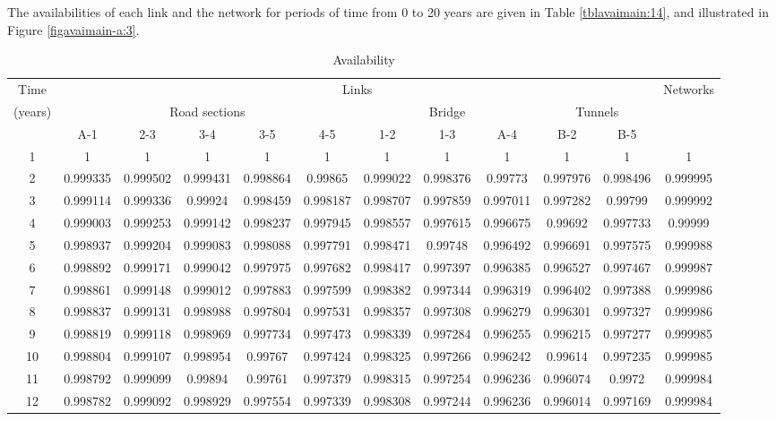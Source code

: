 The availabilities of each link and the network for periods of time from
0 to 20 years are given in Table \ref{tblavaimain:14}, and illustrated in Figure
\ref{figavaimain-a:3}.

\begin{table}[h]
\caption{Availability}
\begin{tabular}{|c|c|c|c|c|c|c|c|c|c|c|c|}
\hline
Time & \multicolumn{10}{c|}{Links} & Networks \\ 
\cline{2-11}
(years) & \multicolumn{5}{c|}{Road sections} & \multicolumn{3}{c|}{Bridge} & \multicolumn{2}{c|}{Tunnels} &  \\ 
\cline{2-11}
 & A-1 & 2-3 & 3-4 & 3-5 & 4-5 & 1-2 & 1-3 & A-4 & B-2 & B-5 &  \\ 
\hline
1 & 1 & 1 & 1 & 1 & 1 & 1 & 1 & 1 & 1 & 1 & 1 \\ 
\hline
2 & 0.999335 & 0.999502 & 0.999431 & 0.998864 & 0.99865 & 0.999022 & 0.998376 & 0.99773 & 0.997976 & 0.998496 & 0.999995 \\ 
\hline
3 & 0.999114 & 0.999336 & 0.99924 & 0.998459 & 0.998187 & 0.998707 & 0.997859 & 0.997011 & 0.997282 & 0.99799 & 0.999992 \\ 
\hline
4 & 0.999003 & 0.999253 & 0.999142 & 0.998237 & 0.997945 & 0.998557 & 0.997615 & 0.996675 & 0.99692 & 0.997733 & 0.99999 \\ 
\hline
5 & 0.998937 & 0.999204 & 0.999083 & 0.998088 & 0.997791 & 0.998471 & 0.99748 & 0.996492 & 0.996691 & 0.997575 & 0.999988 \\ 
\hline
6 & 0.998892 & 0.999171 & 0.999042 & 0.997975 & 0.997682 & 0.998417 & 0.997397 & 0.996385 & 0.996527 & 0.997467 & 0.999987 \\ 
\hline
7 & 0.998861 & 0.999148 & 0.999012 & 0.997883 & 0.997599 & 0.998382 & 0.997344 & 0.996319 & 0.996402 & 0.997388 & 0.999986 \\ 
\hline
8 & 0.998837 & 0.999131 & 0.998988 & 0.997804 & 0.997531 & 0.998357 & 0.997308 & 0.996279 & 0.996301 & 0.997327 & 0.999986 \\ 
\hline
9 & 0.998819 & 0.999118 & 0.998969 & 0.997734 & 0.997473 & 0.998339 & 0.997284 & 0.996255 & 0.996215 & 0.997277 & 0.999985 \\ 
\hline
10 & 0.998804 & 0.999107 & 0.998954 & 0.99767 & 0.997424 & 0.998325 & 0.997266 & 0.996242 & 0.99614 & 0.997235 & 0.999985 \\ 
\hline
11 & 0.998792 & 0.999099 & 0.99894 & 0.99761 & 0.997379 & 0.998315 & 0.997254 & 0.996236 & 0.996074 & 0.9972 & 0.999984 \\ 
\hline
12 & 0.998782 & 0.999092 & 0.998929 & 0.997554 & 0.997339 & 0.998308 & 0.997244 & 0.996236 & 0.996014 & 0.997169 & 0.999984 \\ 

\end{tabular}
\end{table}

